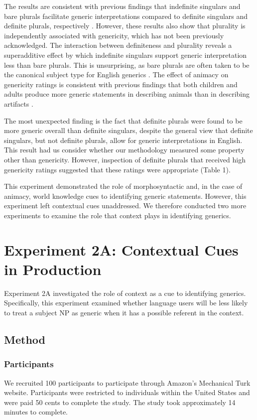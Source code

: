 \documentclass[10pt,letterpaper]{article}
\begin{document}
The results are consistent with previous findings that indefinite singulars and bare plurals facilitate generic interpretations compared to definite singulars and definite plurals, respectively \cite{Cimpian:2011, Gelman:2003}. However, these results also show that plurality is independently associated with genericity, which has not been previously acknowledged. The interaction between definiteness and plurality reveals a superadditive effect by which indefinite singulars support generic interpretation less than bare plurals. This is unsurprising, as bare plurals are often taken to be the canonical subject type for English generics \cite{Carlson:1977,Krifka:1995,Lyons:1977}. The effect of animacy on genericity ratings is consistent with previous findings that both children and adults produce more generic statements in describing animals than in describing artifacts \cite{Brandone:2009}.

The most unexpected finding is the fact that definite plurals were found to be more generic overall than definite singulars, despite the general view that definite singulars, but not definite plurals, allow for generic interpretations in English. This result had us consider whether our methodology measured some property other than genericity. However, inspection of definite plurals that received high genericity ratings suggested that these ratings were appropriate (Table 1).

This experiment demonstrated the role of morphosyntactic and, in the case of animacy, world knowledge cues to identifying generic statements. However, this experiment left contextual cues unaddressed. We therefore conducted two more experiments to examine the role that context plays in identifying generics. 

\section{Experiment 2A: Contextual Cues in Production}

Experiment 2A investigated the role of context as a cue to identifying generics. Specifically, this experiment examined whether language users will be less likely to treat a subject NP as generic when it has a possible referent in the context.

\subsection{Method}

\subsubsection{Participants} \quad We recruited 100 participants to participate through Amazon's Mechanical Turk website. Participants were restricted to individuals within the United States and were paid 50 cents to complete the study. The study took approximately 14 minutes to complete.
\end{document}

